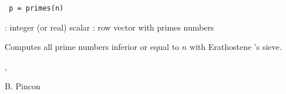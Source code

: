 
\begin{mandesc}
\end{mandesc}

\begin{calling_sequence}
\begin{verbatim}
 p = primes(n)
\end{verbatim}
\end{calling_sequence}

\begin{parameters}
  \begin{varlist}
    : integer (or real) scalar
    : row vector with primes numbers
  \end{varlist}
\end{parameters}

\begin{mandescription}
  Computes all prime numbers inferior or equal to $n$ with 
  Erathostene 's sieve.
\end{mandescription}

\begin{examples}
\begin{program}
\end{program}
\end{examples}


\begin{manseealso}
, 
\end{manseealso}

\begin{authors}
B. Pincon
\end{authors}

